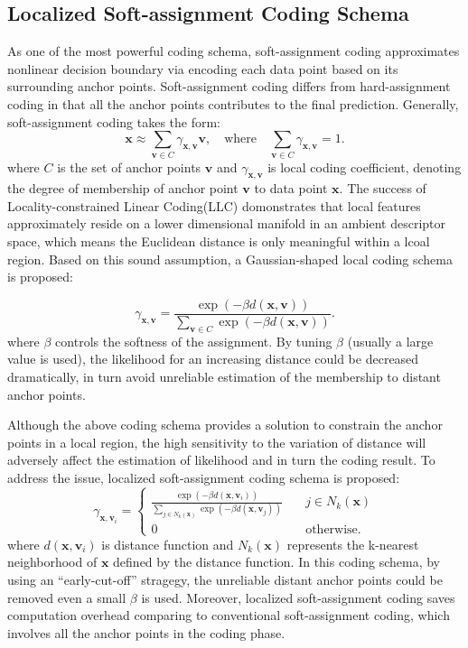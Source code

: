 \documentclass{llncs}
\def \x {\mathbf{x}}
\def \v {\mathbf{v}}
\begin{document}
	\subsection{Localized Soft-assignment Coding Schema}
	As one of the most powerful coding schema, soft-assignment coding approximates nonlinear decision boundary via encoding each data point based on its surrounding anchor points. Soft-assignment coding differs from hard-assignment coding in that all the anchor points contributes to the final prediction. Generally, soft-assignment coding takes the form:
	\begin{equation}
	\x \approx \sum_{\v \in C}\gamma_{\x,\v}\v,\quad \mbox{where} \quad \sum_{\v \in C}\gamma_{\x,\v}=1.
	\end{equation}
	where $C$ is the set of anchor points $\v$ and $\gamma_{\x,\v}$ is local coding coefficient, denoting the degree of membership of anchor point $\v$ to data point $\x$. 
	The success of Locality-constrained Linear Coding(LLC) \cite{11} \cite{12} domonstrates that local features approximately reside on a lower dimensional manifold in an ambient descriptor space, which means the Euclidean distance is only meaningful within a lcoal region. Based on this sound assumption, a Gaussian-shaped local coding schema \cite{9} \cite{10} is proposed:
	
	\begin{equation}
	\gamma_{\x,\v} = 
	\frac{\exp(-\beta d(\x, \v))}{\sum_{\v \in C}\exp(-\beta d(\x,\v))}.
	\end{equation}
	where $\beta$ controls the softness of the assignment. By tuning $\beta$ (usually a large value is used), the likelihood for an increasing distance could be decreased dramatically, in turn avoid unreliable estimation of the membership to distant anchor points. 
	
	Although the above coding schema provides a solution to constrain the anchor points in a local region, the high sensitivity to the variation of distance will adversely affect the estimation of likelihood and in turn the coding result. To address the issue, localized soft-assignment coding schema \cite{8} is proposed: 
	\begin{equation}
	\gamma_{\x,\v_i} = \left\{ \begin{array}{lcl}
	\frac{\exp(-\beta d(\x, \v_i))}{\sum_{j \in N_k(\x)}\exp(-\beta d(\x,\v_j))} \quad &j\in N_k(\x) \\
	0 \quad &\mbox{otherwise}.
	\end{array}
	\right.
	\end{equation}
	where $d(\x,\v_i)$ is distance function and $N_k(\x)$ represents the k-nearest neighborhood of $\x$ defined by the distance function. In this coding schema, by using an ``early-cut-off'' stragegy, the unreliable distant anchor points could be removed even a small $\beta$ is used. Moreover, localized soft-assignment coding saves computation overhead comparing to conventional soft-assignment coding, which involves all the anchor points in the coding phase.
\end{document}
